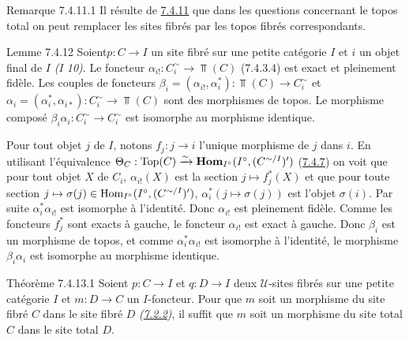 \documentclass[10pt]{../fichiers-configuration-latex/smfart}
\begin{document}
\begin{enonce*}[remark]{Remarque 7.4.11.1}
Il résulte de \hyperref[VI.cor7.4.11]{7.4.11} que dans les questions concernant
le topos total on peut remplacer les sites fibrés par les topos
fibrés correspondants.
\end{enonce*}

\begin{enonce*}{Lemme 7.4.12}
Soient\pageoriginale $p : C \to I$ un site fibré sur une petite
catégorie $I$ et $i$ un objet final de $I$ \emph{(I 10)}. Le
foncteur $\alpha_{i!} : C^{\sim}_i \to \Top(C)$ (7.4.3.4) est exact
et pleinement fidèle. Les couples de foncteurs $\beta_i =
(\alpha_{i!}, \alpha^{\ast}_i) : \Top(C) \to C^{\sim}_i$ et
$\alpha_i = (\alpha_{i}^{\ast}, \alpha_{i
  \ast}) : C^{\sim}_i \to \Top(C)$ sont des morphismes de topos. Le
morphisme composé $\beta_i \alpha_i : C^{\sim}_i \to C^{\sim}_i$ est
isomorphe au morphisme identique.
\end{enonce*}

Pour tout objet $j$ de $I$, notons $f_j : j \to i$ l'unique
morphisme de $j$ dans $i$. En utilisant l'équivalence $\Theta_C :
\operatorname{Top}(C) \xrightarrow{\sim} \operatorname{\mathbf{Hom}}_{I^{\circ}} (I^{\circ},
(C^{\sim/I})')$ (\hyperref[VI.prop7.4.7]{7.4.7}) on voit que pour tout objet $X$
de $C_i$, $\alpha_{i!}(X)$ est la section $j \mapsto f^{\ast}_j(X)$ et
que pour toute section $j \mapsto \sigma(j) \in \operatorname{Hom}_{I^{\circ}}
(I^{\circ}, (C^{\sim/I})')$, $\alpha^{\ast}_i (j \mapsto \sigma(j))$
est  l'objet $\sigma(i)$. Par suite $\alpha^{\ast}_{i} \alpha_{i!}$
est isomorphe à l'identité. Donc $\alpha_{i!}$ est pleinement
fidèle. Comme les foncteurs $f^{\ast}_{j}$ sont exacts à gauche, le
foncteur $\alpha_{i!}$ est exact à gauche. Donc $\beta_i$ est un
morphisme de topos, et comme $\alpha^{\ast}_{i} \alpha_{i!}$ est
isomorphe à l'identité, le morphisme $\beta_i \alpha_i$ est
isomorphe au morphisme identique.


\begin{enonce*}{Théorème 7.4.13.1}
Soient $p : C \to I$ et $q : D \to I$ deux $𝒰$-sites fibrés sur une
petite catégorie $I$ et $m : D \to C$ un $I$-foncteur. Pour que
$m$ soit un morphisme du site fibré $C$ dans le site fibré $D$
\emph{(\hyperref[VI.subsubsec7.2.2]{7.2.2})}, il suffit que $m$ soit un morphisme du site total $C$
dans le site total $D$.
\end{enonce*}

\setcounter{subsubsection}{13}
\setcounter{paragraph}{1}
\end{document}
